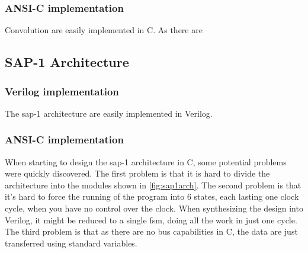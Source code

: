 \subsubsection{ANSI-C implementation}


Convolution are easily implemented in C. As there are


\subsection{SAP-1 Architecture}

\subsubsection{Verilog implementation}
The \gls{sap-1} architecture are easily implemented in Verilog. 
\subsubsection{ANSI-C implementation}
When starting to design the \gls{sap-1} architecture in C, some potential problems were quickly discovered. The first problem is that it is hard to divide the architecture into the modules shown in \cref{fig:sap1arch}. The second problem is that it's hard to force the running of the program into 6 states, each lasting one clock cycle, when you have no control over the clock. When synthesizing the design into Verilog, it might be reduced to a single \gls{fsm}, doing all the work in just one cycle. The third problem is that as there are no bus capabilities in C, the data are just transferred using standard variables.

